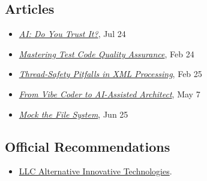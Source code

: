 \documentclass{vl}
\begin{document}
\subsection*{Articles}
\begin{itemize}
    \itemsep0em
    \item\emph{\href{https://dzone.com/articles/ai-do-you-trust-it}{AI: Do You Trust It?}}, Jul 24
    \item\emph{\href{https://dzone.com/articles/mastering-test-code-quality-assurance}{Mastering Test Code Quality
        Assurance}}, Feb 24
    \item\emph{\href{https://dzone.com/articles/thread-safety-pitfalls-in-xml-processing}{Thread-Safety Pitfalls in XML Processing}}, Feb 25
    \item\emph{\href{https://dev.to/volodya-lombrozo/from-vibe-coder-to-ai-assisted-architect-1nao}{From Vibe Coder to AI-Assisted Architect}}, May 7
    \item\emph{\href{https://dzone.com/articles/mock-the-file-system}{Mock the File System}}, Jun 25
\end{itemize}

\subsection*{Official Recommendations}
\begin{itemize}
    \itemsep0em
    \item \href{https://github.com/volodya-lombrozo/volodya-lombrozo.github.io/blob/24eb2bbed8fac71c90ddef6ff4d93de8fb4f9f26/_cv/recommendations/letter_of_recommendation_ait.pdf}{LLC Alternative Innovative Technologies}.
\end{itemize}
\end{document}
